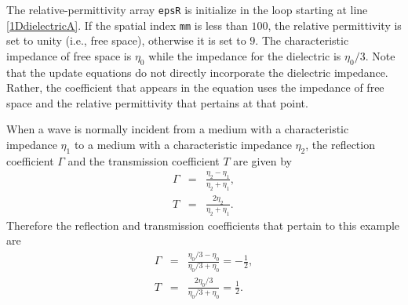The relative-permittivity array {\tt epsR} is initialize in the loop
starting at line \ref{1DdielectricA}.  If the spatial index {\tt mm} is
less than $100$, the relative permittivity is set to unity (i.e., free
space), otherwise it is set to $9$.  The characteristic impedance of
free space is $\eta_0$ while the impedance for the dielectric is
$\eta_0/3$.  Note that the update equations do not directly
incorporate the dielectric impedance.  Rather, the coefficient that
appears in the equation uses the impedance of free space and the
relative permittivity that pertains at that point.

When a wave is normally incident from a medium with a characteristic
impedance $\eta_1$ to a medium with a characteristic impedance
$\eta_2$, the reflection coefficient $\Gamma$ and the transmission
coefficient $T$ are given by
\begin{eqnarray}
 \Gamma &=& \frac{\eta_2 - \eta_1}{\eta_2 + \eta_1}, \label{eq:gamma}\\
      T &=& \frac{2 \eta_2}{\eta_2 + \eta_1}.
\end{eqnarray}
Therefore the reflection and transmission coefficients
that pertain to this example are
\begin{eqnarray}
  \Gamma &=& \frac{\eta_0/3 - \eta_0}{\eta_0/3 + \eta_0} =
            -\frac{1}{2}, \\
  T &=& \frac{2 \eta_0/3}{\eta_0/3 + \eta_0} = \frac{1}{2}.
\end{eqnarray}

